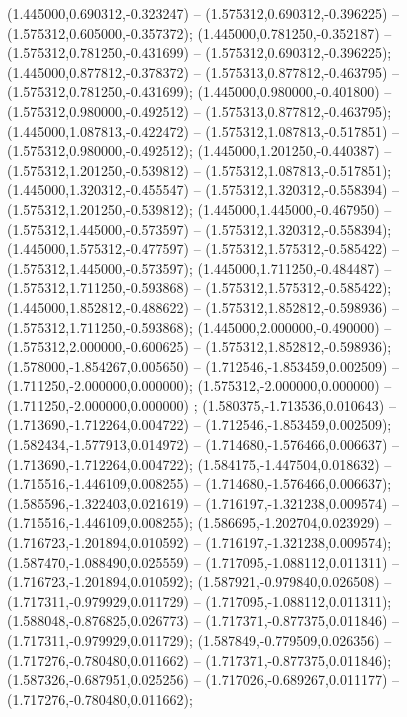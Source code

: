  (1.445000,0.690312,-0.323247) -- (1.575312,0.690312,-0.396225) -- (1.575312,0.605000,-0.357372);
 (1.445000,0.781250,-0.352187) -- (1.575312,0.781250,-0.431699) -- (1.575312,0.690312,-0.396225);
 (1.445000,0.877812,-0.378372) -- (1.575313,0.877812,-0.463795) -- (1.575312,0.781250,-0.431699);
 (1.445000,0.980000,-0.401800) -- (1.575312,0.980000,-0.492512) -- (1.575313,0.877812,-0.463795);
 (1.445000,1.087813,-0.422472) -- (1.575312,1.087813,-0.517851) -- (1.575312,0.980000,-0.492512);
 (1.445000,1.201250,-0.440387) -- (1.575312,1.201250,-0.539812) -- (1.575312,1.087813,-0.517851);
 (1.445000,1.320312,-0.455547) -- (1.575312,1.320312,-0.558394) -- (1.575312,1.201250,-0.539812);
 (1.445000,1.445000,-0.467950) -- (1.575312,1.445000,-0.573597) -- (1.575312,1.320312,-0.558394);
 (1.445000,1.575312,-0.477597) -- (1.575312,1.575312,-0.585422) -- (1.575312,1.445000,-0.573597);
 (1.445000,1.711250,-0.484487) -- (1.575312,1.711250,-0.593868) -- (1.575312,1.575312,-0.585422);
 (1.445000,1.852812,-0.488622) -- (1.575312,1.852812,-0.598936) -- (1.575312,1.711250,-0.593868);
 (1.445000,2.000000,-0.490000) -- (1.575312,2.000000,-0.600625) -- (1.575312,1.852812,-0.598936);
 (1.578000,-1.854267,0.005650) -- (1.712546,-1.853459,0.002509) -- (1.711250,-2.000000,0.000000);
 (1.575312,-2.000000,0.000000) -- (1.711250,-2.000000,0.000000) ;
 (1.580375,-1.713536,0.010643) -- (1.713690,-1.712264,0.004722) -- (1.712546,-1.853459,0.002509);
 (1.582434,-1.577913,0.014972) -- (1.714680,-1.576466,0.006637) -- (1.713690,-1.712264,0.004722);
 (1.584175,-1.447504,0.018632) -- (1.715516,-1.446109,0.008255) -- (1.714680,-1.576466,0.006637);
 (1.585596,-1.322403,0.021619) -- (1.716197,-1.321238,0.009574) -- (1.715516,-1.446109,0.008255);
 (1.586695,-1.202704,0.023929) -- (1.716723,-1.201894,0.010592) -- (1.716197,-1.321238,0.009574);
 (1.587470,-1.088490,0.025559) -- (1.717095,-1.088112,0.011311) -- (1.716723,-1.201894,0.010592);
 (1.587921,-0.979840,0.026508) -- (1.717311,-0.979929,0.011729) -- (1.717095,-1.088112,0.011311);
 (1.588048,-0.876825,0.026773) -- (1.717371,-0.877375,0.011846) -- (1.717311,-0.979929,0.011729);
 (1.587849,-0.779509,0.026356) -- (1.717276,-0.780480,0.011662) -- (1.717371,-0.877375,0.011846);
 (1.587326,-0.687951,0.025256) -- (1.717026,-0.689267,0.011177) -- (1.717276,-0.780480,0.011662);
